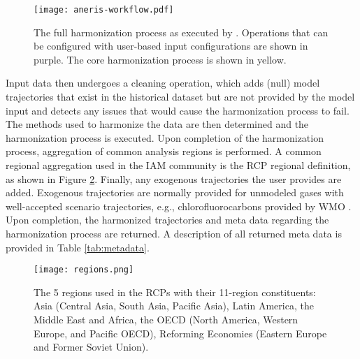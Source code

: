 \begin{figure}
  \begin{center}
    \texttt{[image: aneris-workflow.pdf]}
    \caption[]{
      \label{fig:workflow}
      The full harmonization process as executed by . Operations
      that can be configured with user-based input configurations are shown in
      purple. The core harmonization process is shown in yellow.  }
  \end{center}
\end{figure}

Input data then undergoes a cleaning operation, which adds (null) model
trajectories that exist in the historical dataset but are not provided by the
model input and detects any issues that would cause the harmonization process to
fail. The methods used to harmonize the data are then determined and the
harmonization process is executed. Upon completion of the harmonization process,
aggregation of common analysis regions is performed. A common regional
aggregation used in the IAM community is the RCP regional definition, as shown
in Figure \ref{fig:regions}. Finally, any exogenous trajectories the user provides
are added. Exogenous trajectories are normally provided for unmodeled gases with
well-accepted scenario trajectories, e.g., chlorofluorocarbons provided by WMO
\cite{wmo2014}. Upon completion, the harmonized trajectories and meta data
regarding the harmonization process are returned. A description of all returned
meta data is provided in Table \ref{tab:metadata}.


\begin{figure}
  \begin{center}
    \texttt{[image: regions.png]}
    \caption[]{
      \label{fig:regions}
      The 5 regions used in the RCPs with their 11-region constituents: Asia
      (Central Asia, South Asia, Pacific Asia), Latin America, the Middle East
      and Africa, the OECD (North America, Western Europe, and Pacific OECD),
      Reforming Economies (Eastern Europe and Former Soviet Union).
    }
  \end{center}
\end{figure}


